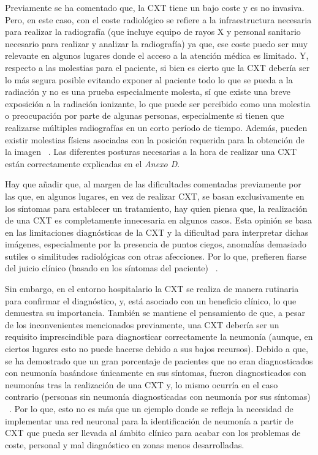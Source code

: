 Previamente se ha comentado que, la CXT tiene un bajo coste y es no invasiva. Pero, en este caso, con el coste radiológico se refiere a la infraestructura necesaria para realizar la radiografía (que incluye equipo de rayos X y personal sanitario necesario para realizar y analizar la radiografía) ya que, ese coste puedo ser muy relevante en algunos lugares donde el acceso a la atención médica es limitado. Y, respecto a las molestias para el paciente, si bien es cierto que la CXT debería ser lo más segura posible evitando exponer al paciente todo lo que se pueda a la radiación y no es una prueba especialmente molesta, sí que existe una breve exposición a la radiación ionizante, lo que puede ser percibido como una molestia o preocupación por parte de algunas personas, especialmente si tienen que realizarse múltiples radiografías en un corto período de tiempo. Además, pueden existir molestias físicas asociadas con la posición requerida para la obtención de la imagen ~\cite{wootton2014diagnosis}.  Las diferentes posturas necesarias a la hora de realizar una CXT están correctamente explicadas en el \textit{Anexo D}.  

Hay que añadir que, al margen de las dificultades comentadas previamente por las que, en algunos lugares, en vez de realizar CXT, se basan exclusivamente en los síntomas para establecer un tratamiento, hay quien piensa que, la realización de una CXT es completamente innecesaria en algunos casos. Esta opinión se basa en las limitaciones diagnósticas de la CXT y la dificultad para interpretar dichas imágenes, especialmente por la presencia de puntos ciegos, anomalías demasiado sutiles o similitudes radiológicas con otras afecciones. Por lo que, prefieren fiarse del juicio clínico (basado en los síntomas del paciente) ~\cite{wootton2014diagnosis}.

Sin embargo, en el entorno hospitalario la CXT se realiza de manera rutinaria para confirmar el diagnóstico, y, está asociado con un beneficio clínico, lo que demuestra su importancia. También se mantiene el pensamiento de que, a pesar de los inconvenientes mencionados previamente, una CXT debería ser un requisito imprescindible para diagnosticar correctamente la neumonía (aunque, en ciertos lugares esto no puede hacerse debido a sus bajos recursos). Debido a que, se ha demostrado que un gran porcentaje de pacientes que no eran diagnosticados con neumonía basándose únicamente en sus síntomas, fueron diagnosticados con neumonías tras la realización de una CXT y, lo mismo ocurría en el caso contrario (personas sin neumonía diagnosticadas con neumonía por sus síntomas) ~\cite{wootton2014diagnosis}. Por lo que, esto no es más que un ejemplo donde se refleja la necesidad de implementar una red neuronal para la identificación de neumonía a partir de CXT que pueda ser llevada al ámbito clínico para acabar con los problemas de coste, personal y mal diagnóstico en zonas menos desarrolladas.

